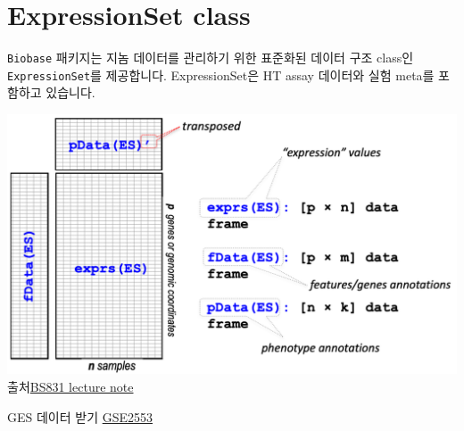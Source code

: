 \documentclass[
]{book}
\newenvironment{Shaded}{\begin{snugshade}}{\end{snugshade}}
\newcommand{\AttributeTok}[1]{\textcolor[rgb]{0.77,0.63,0.00}{#1}}
\newcommand{\ConstantTok}[1]{\textcolor[rgb]{0.00,0.00,0.00}{#1}}
\newcommand{\DecValTok}[1]{\textcolor[rgb]{0.00,0.00,0.81}{#1}}
\newcommand{\DocumentationTok}[1]{\textcolor[rgb]{0.56,0.35,0.01}{\textbf{\textit{#1}}}}
\newcommand{\FunctionTok}[1]{\textcolor[rgb]{0.00,0.00,0.00}{#1}}
\newcommand{\NormalTok}[1]{#1}
\newcommand{\OtherTok}[1]{\textcolor[rgb]{0.56,0.35,0.01}{#1}}
\newcommand{\SpecialCharTok}[1]{\textcolor[rgb]{0.00,0.00,0.00}{#1}}
\newcommand{\StringTok}[1]{\textcolor[rgb]{0.31,0.60,0.02}{#1}}
\begin{document}
\hypertarget{expressionset-class}{%
\section{ExpressionSet class}\label{expressionset-class}}

\texttt{Biobase} 패키지는 지놈 데이터를 관리하기 위한 표준화된 데이터 구조 class인 \texttt{ExpressionSet}를 제공합니다. ExpressionSet은 HT assay 데이터와 실험 meta를 포함하고 있습니다.

\includegraphics[width=6.25in,height=\textheight]{images/12/ExpressionSet.png}
출처\href{https://montilab.github.io/BS831/articles/docs/ExpressionSet.html}{BS831 lecture note}

GES 데이터 받기 \href{https://www.ncbi.nlm.nih.gov/geo/query/acc.cgi?acc=GSE2553}{GSE2553}

\begin{Shaded}
\end{Shaded}
\end{document}
